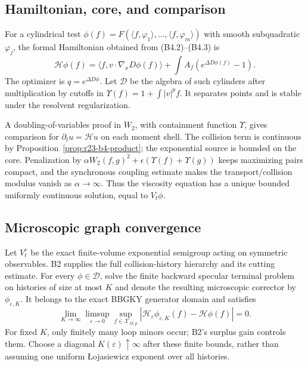 \subsection{Hamiltonian, core, and comparison}

For a cylindrical test
$\phi(f)=F(\langle f,\varphi_1\rangle,\ldots,
\langle f,\varphi_m\rangle)$ with smooth subquadratic $\varphi_j$, the formal
Hamiltonian obtained from (B4.2)--(B4.3) is
\[
 \mathcal H\phi(f)=
 \langle f,v\cdot\nabla_xD\phi(f)\rangle
 +\int A_f\left(e^{\Delta D\phi(f)}-1\right).             \tag{B4.12}
\]
The optimizer is $q=e^{\Delta D\phi}$.  Let $\mathcal D$ be the algebra of
such cylinders after multiplication by cutoffs in
$\Upsilon(f)=1+\int|v|^p f$.  It separates points and is stable under the
resolvent regularization.

A doubling-of-variables proof in $W_2$, with containment function $\Upsilon$,
gives comparison for
$\partial_tu=\mathcal Hu$ on each moment shell.  The collision term is
continuous by Proposition~\ref{prop:r23-b4-product}; the exponential source
is bounded on the core.  Penalization by
$\alpha W_2(f,g)^2+\epsilon(\Upsilon(f)+\Upsilon(g))$
keeps maximizing pairs compact, and the synchronous coupling estimate makes
the transport/collision modulus vanish as $\alpha\to\infty$.  Thus the
viscosity equation has a unique bounded uniformly continuous solution, equal
to $V_t\phi$.

\subsection{Microscopic graph convergence}

Let $V_t^\varepsilon$ be the exact finite-volume exponential semigroup acting
on symmetric observables.  B2 supplies the full collision-history hierarchy
and its cutting estimate.  For every $\phi\in\mathcal D$, solve the finite
backward specular terminal problem on histories of size at most $K$ and denote
the resulting microscopic corrector by $\phi_{\varepsilon,K}$.  It belongs to
the exact BBGKY generator domain and satisfies
\[
 \lim_{K\to\infty}\limsup_{\varepsilon\to0}
 \sup_{f\in\mathcal X_{M,p}}
 |\mathcal H_\varepsilon\phi_{\varepsilon,K}(f)
   -\mathcal H\phi(f)|=0.                                \tag{B4.13}
\]
For fixed $K$, only finitely many loop minors occur; B2's surplus gain controls
them.  Choose a diagonal $K(\varepsilon)\uparrow\infty$ after these finite
bounds, rather than assuming one uniform Łojasiewicz exponent over all
histories.

